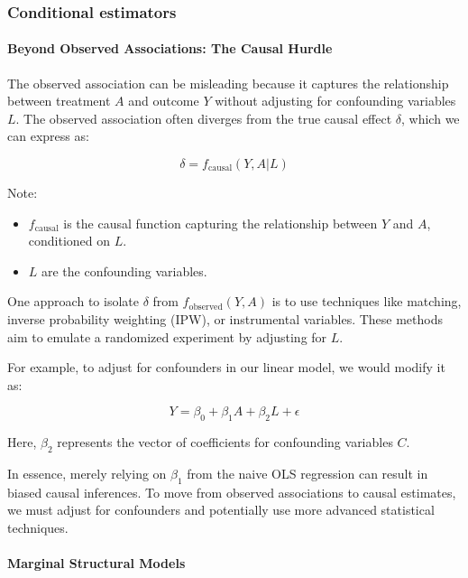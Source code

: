 \documentclass[
  singlecolumn]{article}
\let\oldparagraph\paragraph
\renewcommand{\paragraph}[1]{\oldparagraph{#1}\mbox{}}
\providecommand{\tightlist}{%
  \setlength{\itemsep}{0pt}\setlength{\parskip}{0pt}}\usepackage{longtable,booktabs,array}
\begin{document}
\subsubsection{Conditional estimators}\label{conditional-estimators}

\paragraph{Beyond Observed Associations: The Causal
Hurdle}\label{beyond-observed-associations-the-causal-hurdle}

The observed association can be misleading because it captures the
relationship between treatment \(A\) and outcome \(Y\) without adjusting
for confounding variables \(L\). The observed association often diverges
from the true causal effect \(\delta\), which we can express as:

\[
\delta = f_{\text{causal}}(Y, A | L)
\]

Note:

\begin{itemize}
\tightlist
\item
  \(f_{\text{causal}}\) is the causal function capturing the
  relationship between \(Y\) and \(A\), conditioned on \(L\).
\item
  \(L\) are the confounding variables.
\end{itemize}

One approach to isolate \(\delta\) from \(f_{\text{observed}}(Y, A)\) is
to use techniques like matching, inverse probability weighting (IPW), or
instrumental variables. These methods aim to emulate a randomized
experiment by adjusting for \(L\).

For example, to adjust for confounders in our linear model, we would
modify it as:

\[
Y = \beta_0 + \beta_1 A + \beta_2 L + \epsilon
\]

Here, \(\beta_2\) represents the vector of coefficients for confounding
variables \(C\).

In essence, merely relying on \(\beta_1\) from the naive OLS regression
can result in biased causal inferences. To move from observed
associations to causal estimates, we must adjust for confounders and
potentially use more advanced statistical techniques.

\paragraph{Marginal Structural Models}\label{marginal-structural-models}
\end{document}
